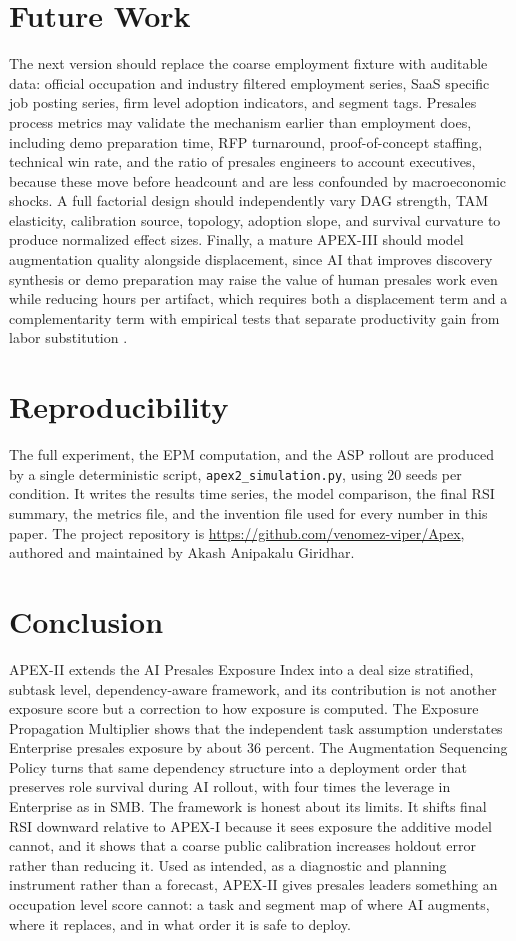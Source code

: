 \documentclass[10pt,conference]{IEEEtran}
\begin{document}
\section{Future Work}
The next version should replace the coarse employment fixture with auditable data: official occupation and industry filtered employment series, SaaS specific job posting series, firm level adoption indicators, and segment tags. Presales process metrics may validate the mechanism earlier than employment does, including demo preparation time, RFP turnaround, proof-of-concept staffing, technical win rate, and the ratio of presales engineers to account executives, because these move before headcount and are less confounded by macroeconomic shocks. A full factorial design should independently vary DAG strength, TAM elasticity, calibration source, topology, adoption slope, and survival curvature to produce normalized effect sizes. Finally, a mature APEX-III should model augmentation quality alongside displacement, since AI that improves discovery synthesis or demo preparation may raise the value of human presales work even while reducing hours per artifact, which requires both a displacement term and a complementarity term with empirical tests that separate productivity gain from labor substitution \cite{raisch2021artificial}.

\section{Reproducibility}
The full experiment, the EPM computation, and the ASP rollout are produced by a single deterministic script, \texttt{apex2\_simulation.py}, using 20 seeds per condition. It writes the results time series, the model comparison, the final RSI summary, the metrics file, and the invention file used for every number in this paper. The project repository is \url{https://github.com/venomez-viper/Apex}, authored and maintained by Akash Anipakalu Giridhar.

\section{Conclusion}
APEX-II extends the AI Presales Exposure Index into a deal size stratified, subtask level, dependency-aware framework, and its contribution is not another exposure score but a correction to how exposure is computed. The Exposure Propagation Multiplier shows that the independent task assumption understates Enterprise presales exposure by about 36 percent. The Augmentation Sequencing Policy turns that same dependency structure into a deployment order that preserves role survival during AI rollout, with four times the leverage in Enterprise as in SMB. The framework is honest about its limits. It shifts final RSI downward relative to APEX-I because it sees exposure the additive model cannot, and it shows that a coarse public calibration increases holdout error rather than reducing it. Used as intended, as a diagnostic and planning instrument rather than a forecast, APEX-II gives presales leaders something an occupation level score cannot: a task and segment map of where AI augments, where it replaces, and in what order it is safe to deploy.



\end{document}
